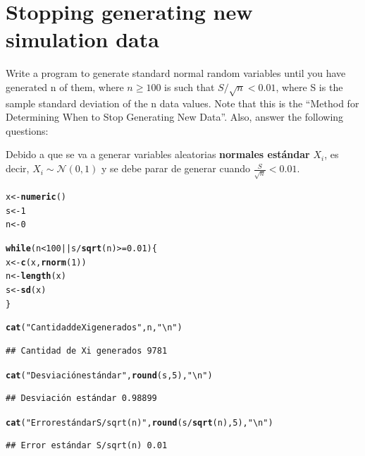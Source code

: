 \documentclass[12pt]{article}\usepackage[]{graphicx}\usepackage[]{xcolor}
\makeatletter
\newcommand{\hlnum}[1]{\textcolor[rgb]{0.686,0.059,0.569}{#1}}%
\newcommand{\hlsng}[1]{\textcolor[rgb]{0.192,0.494,0.8}{#1}}%
\newcommand{\hlopt}[1]{\textcolor[rgb]{0,0,0}{#1}}%
\newcommand{\hldef}[1]{\textcolor[rgb]{0.345,0.345,0.345}{#1}}%
\newcommand{\hlkwa}[1]{\textcolor[rgb]{0.161,0.373,0.58}{\textbf{#1}}}%
\newcommand{\hlkwb}[1]{\textcolor[rgb]{0.69,0.353,0.396}{#1}}%
\newcommand{\hlkwd}[1]{\textcolor[rgb]{0.737,0.353,0.396}{\textbf{#1}}}%
\newenvironment{kframe}{%
 \def\at@end@of@kframe{}%
 \ifinner\ifhmode%
  \def\at@end@of@kframe{\end{minipage}}%
  \begin{minipage}{\columnwidth}%
 \fi\fi%
 \def\FrameCommand##1{\hskip\@totalleftmargin \hskip-\fboxsep
 \colorbox{shadecolor}{##1}\hskip-\fboxsep
     \hskip-\linewidth \hskip-\@totalleftmargin \hskip\columnwidth}%
 \MakeFramed {\advance\hsize-\width
   \@totalleftmargin\z@ \linewidth\hsize
   \@setminipage}}%
 {\par\unskip\endMakeFramed%
 \at@end@of@kframe}
\newenvironment{knitrout}{}{} %
\makeatother
\begin{document}
\section{Stopping generating new simulation data}

Write a program to generate standard normal random variables until you have generated n of them, where $n \geq 100$ is such that $S/\sqrt{n} < 0.01$, where S is the sample standard deviation of the n data values. Note that this is the ``Method for Determining When to Stop Generating New Data''. Also, answer the following questions:



Debido a que se va a generar variables aleatorias \textbf{normales estándar} $X_{i}$, es decir, $X_{i} \sim \mathcal{N}(0, 1)$ y se debe parar de generar cuando $\frac{S}{\sqrt{n}} < 0.01$.

\begin{knitrout}
\color{fgcolor}\begin{kframe}
\begin{alltt}
\hldef{x} \hlkwb{<-} \hlkwd{numeric}\hldef{()}
\hldef{s} \hlkwb{<-} \hlnum{1}
\hldef{n} \hlkwb{<-} \hlnum{0}

\hlkwa{while}\hldef{(n} \hlopt{<} \hlnum{100} \hlopt{||} \hldef{s} \hlopt{/} \hlkwd{sqrt}\hldef{(n)} \hlopt{>=} \hlnum{0.01}\hldef{) \{}
  \hldef{x} \hlkwb{<-} \hlkwd{c}\hldef{(x,} \hlkwd{rnorm}\hldef{(}\hlnum{1}\hldef{))}
  \hldef{n} \hlkwb{<-} \hlkwd{length}\hldef{(x)}
  \hldef{s} \hlkwb{<-} \hlkwd{sd}\hldef{(x)}
\hldef{\}}

\hlkwd{cat}\hldef{(}\hlsng{"Cantidad de Xi generados"}\hldef{, n,} \hlsng{"\textbackslash{}n"}\hldef{)}
\end{alltt}
\begin{verbatim}
## Cantidad de Xi generados 9781
\end{verbatim}
\begin{alltt}
\hlkwd{cat}\hldef{(}\hlsng{"Desviación estándar"}\hldef{,} \hlkwd{round}\hldef{(s,} \hlnum{5}\hldef{),} \hlsng{"\textbackslash{}n"}\hldef{)}
\end{alltt}
\begin{verbatim}
## Desviación estándar 0.98899
\end{verbatim}
\begin{alltt}
\hlkwd{cat}\hldef{(}\hlsng{"Error estándar S/sqrt(n)"}\hldef{,} \hlkwd{round}\hldef{(s}\hlopt{/}\hlkwd{sqrt}\hldef{(n),} \hlnum{5}\hldef{),} \hlsng{"\textbackslash{}n"}\hldef{)}
\end{alltt}
\begin{verbatim}
## Error estándar S/sqrt(n) 0.01
\end{verbatim}
\end{kframe}
\end{knitrout}
\end{document}
